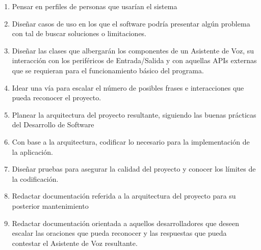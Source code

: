 \begin{enumerate}[O-DD.1 -]
	\item Pensar en perfiles de personas que usarían el sistema
	\item Diseñar casos de uso en los que el software podría presentar algún problema con tal de buscar soluciones o limitaciones.
	\item Diseñar las clases que albergarán los componentes de un Asistente de Voz, su interacción con los periféricos de Entrada/Salida y con aquellas APIs externas que se requieran para el funcionamiento básico del programa.
	\item Idear una vía para escalar el número de posibles frases e interacciones que pueda reconocer el proyecto.
	\item Planear la arquitectura del proyecto resultante, siguiendo las buenas prácticas del Desarrollo de Software
	\item Con base a la arquitectura, codificar lo necesario para la implementación de la aplicación.
	\item Diseñar pruebas para asegurar la calidad del proyecto y conocer los límites de la codificación.
	\item Redactar documentación referida a la arquitectura del proyecto para su posterior mantenimiento
	\item Redactar documentación orientada a aquellos desarrolladores que deseen escalar las oraciones que pueda reconocer y las respuestas que pueda contestar el Asistente de Voz resultante.
	
\end{enumerate}


